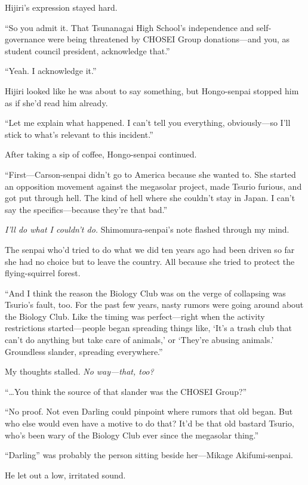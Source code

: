 \documentclass[
    a4paper,
    12pt,
    twoside,
    openany,
    UTF8,
    fontset=windows
]{ctexbook}
\begin{document}
Hijiri's expression stayed hard.

``So you admit it. That Tsunanagai High School's independence and self-governance were being threatened by CHOSEI Group donations---and you, as student council president, acknowledge that.''

``Yeah. I acknowledge it.''

Hijiri looked like he was about to say something, but Hongo-senpai stopped him as if she'd read him already.

``Let me explain what happened. I can't tell you everything, obviously---so I'll stick to what's relevant to this incident.''

After taking a sip of coffee, Hongo-senpai continued.

``First---Carson-senpai didn't go to America because she wanted to. She started an opposition movement against the megasolar project, made Tsurio furious, and got put through hell. The kind of hell where she couldn't stay in Japan. I can't say the specifics---because they're that bad.''

\textit{I'll do what I couldn't do.} Shimomura-senpai's note flashed through my mind.

The senpai who'd tried to do what we did ten years ago had been driven so far she had no choice but to leave the country. All because she tried to protect the flying-squirrel forest.

``And I think the reason the Biology Club was on the verge of collapsing was Tsurio's fault, too. For the past few years, nasty rumors were going around about the Biology Club. Like the timing was perfect---right when the activity restrictions started---people began spreading things like, `It's a trash club that can't do anything but take care of animals,' or `They're abusing animals.' Groundless slander, spreading everywhere.''

My thoughts stalled. \textit{No way---that, too?}

``\dots You think the source of that slander was the CHOSEI Group?''

``No proof. Not even Darling could pinpoint where rumors that old began. But who else would even have a motive to do that? It'd be that old bastard Tsurio, who's been wary of the Biology Club ever since the megasolar thing.''

``Darling'' was probably the person sitting beside her---Mikage Akifumi-senpai.

He let out a low, irritated sound.
\end{document}

